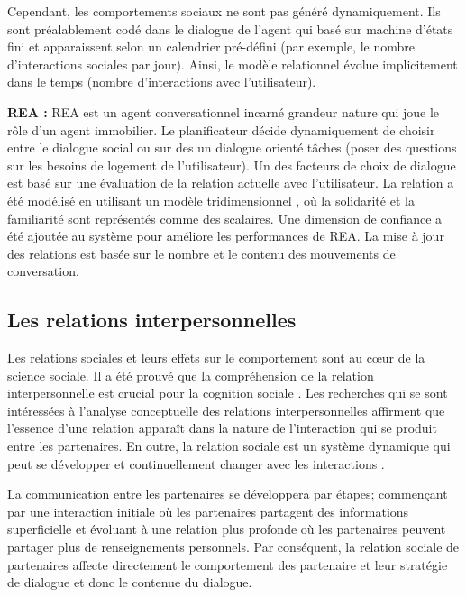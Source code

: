 \documentclass[a4paper,french]{article}
\begin{document}
\par Cependant, les comportements sociaux ne sont pas généré dynamiquement. Ils sont préalablement codé dans le dialogue de l'agent qui basé sur machine d'états fini et apparaissent selon un calendrier pré-défini (par exemple, le nombre d'interactions sociales par jour). Ainsi, le modèle relationnel évolue implicitement dans le temps (nombre d'interactions avec l'utilisateur).


\par \textbf{REA : } REA \cite{bickmore2005establishing} est un agent conversationnel incarné grandeur nature qui joue le rôle d'un agent immobilier. Le planificateur décide dynamiquement  de choisir entre le dialogue social  ou sur des un dialogue orienté tâches (poser des questions sur les besoins de logement de l'utilisateur). Un des facteurs de choix de dialogue est basé sur une évaluation de la relation actuelle avec l'utilisateur. La relation a été modélisé en utilisant un modèle tridimensionnel \cite{svennevig2000getting}, où la solidarité et la familiarité sont représentés comme des scalaires. Une dimension de confiance a été ajoutée au système pour améliore les performances de REA. La  mise à jour des  relations est basée sur le nombre et le contenu des mouvements de conversation.

\subsection{Les relations interpersonnelles}
\par Les relations sociales et leurs effets sur le comportement sont au cœur de la science sociale. Il a été prouvé que la compréhension de la relation interpersonnelle est crucial pour la cognition sociale \cite{reis2000relationship}. Les recherches qui se sont intéressées à l'analyse conceptuelle des relations interpersonnelles affirment que l'essence d'une relation apparaît dans la nature de l'interaction qui se produit entre les partenaires. En outre, la relation sociale est un système dynamique qui peut se développer et continuellement changer avec les interactions \cite {reis2000relationship,svennevig2000getting}.
\par La communication entre les partenaires se développera par étapes; commençant par une interaction initiale où les partenaires partagent des informations superficielle et évoluant à une relation plus profonde où les partenaires peuvent partager plus de renseignements personnels. Par conséquent, la relation sociale de partenaires affecte directement le comportement des partenaire et leur stratégie de dialogue et donc le contenue du dialogue.
\end{document}
